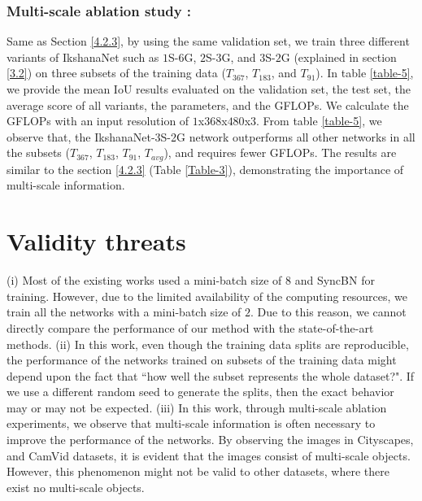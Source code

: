 \documentclass{article}
\begin{document}
\subsubsection{Multi-scale ablation study :}
\label{4.3.2}
Same as Section \ref{4.2.3}, by using the same validation set, we train three different variants of IkshanaNet such as $1$S-$6$G, $2$S-$3$G, and $3$S-$2$G (explained in section \ref{3.2}) on three subsets of the training data ($T_{367}$, $T_{183}$, and $T_{91}$). \newline
In table \ref{table-5}, we provide the mean IoU results evaluated on the validation set, the test set, the average score of all variants, the parameters, and the GFLOPs. We calculate the GFLOPs with an input resolution of $1$x$368$x$480$x$3$.\newline
From table \ref{table-5}, we observe that, the IkshanaNet-3S-2G network outperforms all other networks in all the subsets ($T_{367}$,  $T_{183}$,  $T_{91}$, $T_{avg}$), and requires fewer GFLOPs. The results are similar to the section \ref{4.2.3} (Table \ref{Table-3}), demonstrating the importance of multi-scale information.


\section{Validity threats}
\label{validity-threats}
\noindent
(i) Most of the existing works \cite{chen2018encoder,zhao2017pyramid,10.1007/978-3-030-58539-6_11} used a mini-batch size of $8$ and SyncBN \cite{rotabulo2017place,Zhang_2018_CVPR} for training. However, due to the limited availability of the computing resources, we train all the networks with a mini-batch size of $2$. Due to this reason, we cannot directly compare the performance of our method with the state-of-the-art methods.\newline
(ii) In this work, even though the training data splits are reproducible, the performance of the networks trained on subsets of the training data might depend upon the fact that ``how well the subset represents the whole dataset?". If we use a different random seed to generate the splits, then the exact behavior may or may not be expected.\newline
(iii) In this work, through multi-scale ablation experiments, we observe that multi-scale information is often necessary to improve the performance of the networks. By observing the images in Cityscapes, and CamVid datasets,  it is evident that the images consist of multi-scale objects. However, this phenomenon might not be valid to other datasets, where there exist no multi-scale objects.
\end{document}
